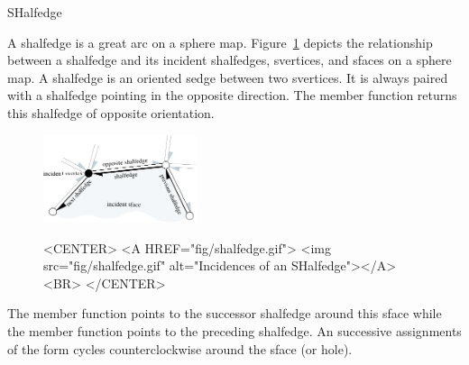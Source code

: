 
\ccRefPageBegin



\begin{ccRefClass}{SHalfedge}

\ccDefinition

A shalfedge is a great arc on a sphere map. 
Figure~\ref{figureNef3HalfedgeIncidences}
depicts the relationship between a shalfedge and its incident
shalfedges, svertices, and sfaces on a sphere map.  A shalfedge is 
an oriented sedge between two svertices. It is always paired with a 
shalfedge pointing in
the opposite direction. The  member function returns
this shalfedge of opposite orientation.

    \begin{figure}[bht]
\begin{ccTexOnly}
        \begin{center}
          \parbox{0.4\textwidth}{%
              \includegraphics[width=0.4\textwidth]{Nef_3_ref/fig/shalfedge}%
          }
        \end{center}
\end{ccTexOnly}

\begin{ccHtmlOnly}
    <CENTER>
    <A HREF="fig/shalfedge.gif">
        <img src="fig/shalfedge.gif" 
             alt="Incidences of an SHalfedge"></A><BR>
    </CENTER>
\end{ccHtmlOnly}
        \label{figureNef3HalfedgeIncidences}
    \end{figure}

The  member function points 
to the successor shalfedge around this sface while the  member 
function points to the preceding shalfedge.  An
successive assignments of the form  cycles
counterclockwise around the sface (or hole).


\end{ccRefClass}
